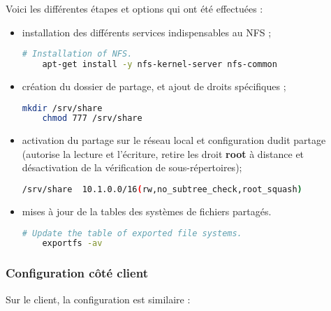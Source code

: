 Voici les différentes étapes et options qui ont été effectuées :
\begin{itemize}
\item installation des différents services indispensables au NFS ;

  \begin{lstlisting}[language=bash]
    # Installation of NFS.
    apt-get install -y nfs-kernel-server nfs-common
  \end{lstlisting}

\item création du dossier de partage, et ajout de droits
  spécifiques ;

  \begin{lstlisting}[language=bash]
    mkdir /srv/share
    chmod 777 /srv/share
  \end{lstlisting}

\item activation du partage sur le réseau local et configuration dudit
  partage (autorise la lecture et l'écriture, retire les droit \textbf{root} à
  distance et désactivation de la vérification de sous-répertoires);

  \begin{lstlisting}[language=bash]
    /srv/share  10.1.0.0/16(rw,no_subtree_check,root_squash)
  \end{lstlisting}

\item mises à jour de la tables des systèmes de fichiers partagés.

  \begin{lstlisting}[language=bash]
    # Update the table of exported file systems.
    exportfs -av
  \end{lstlisting}
\end{itemize}

\subsubsection{Configuration côté client}
\label{subsubsec:config-client}

Sur le client, la configuration est similaire :

